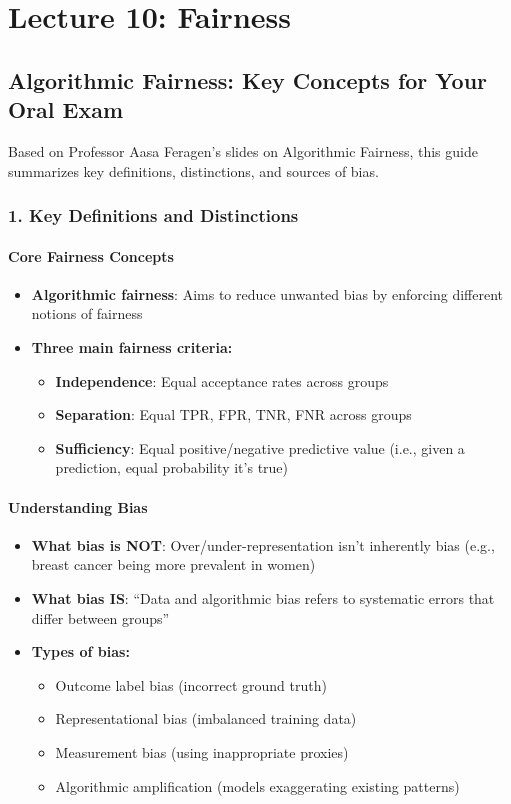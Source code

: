 \chapter{\normalsize Lecture 10: Fairness }

\section*{Algorithmic Fairness: Key Concepts for Your Oral Exam}

Based on Professor Aasa Feragen's slides on Algorithmic Fairness, this guide summarizes key definitions, distinctions, and sources of bias.

\subsection*{1. Key Definitions and Distinctions}

\subsubsection*{Core Fairness Concepts}
\begin{itemize}
    \item \textbf{Algorithmic fairness}: Aims to reduce unwanted bias by enforcing different notions of fairness
    \item \textbf{Three main fairness criteria:}
    \begin{itemize}
        \item \textbf{Independence}: Equal acceptance rates across groups
        \item \textbf{Separation}: Equal TPR, FPR, TNR, FNR across groups
        \item \textbf{Sufficiency}: Equal positive/negative predictive value (i.e., given a prediction, equal probability it's true)
    \end{itemize}
\end{itemize}

\subsubsection*{Understanding Bias}
\begin{itemize}
    \item \textbf{What bias is NOT}: Over/under-representation isn't inherently bias (e.g., breast cancer being more prevalent in women)
    \item \textbf{What bias IS}: ``Data and algorithmic bias refers to systematic errors that differ between groups''
    \item \textbf{Types of bias:}
    \begin{itemize}
        \item Outcome label bias (incorrect ground truth)
        \item Representational bias (imbalanced training data)
        \item Measurement bias (using inappropriate proxies)
        \item Algorithmic amplification (models exaggerating existing patterns)
    \end{itemize}
\end{itemize}
